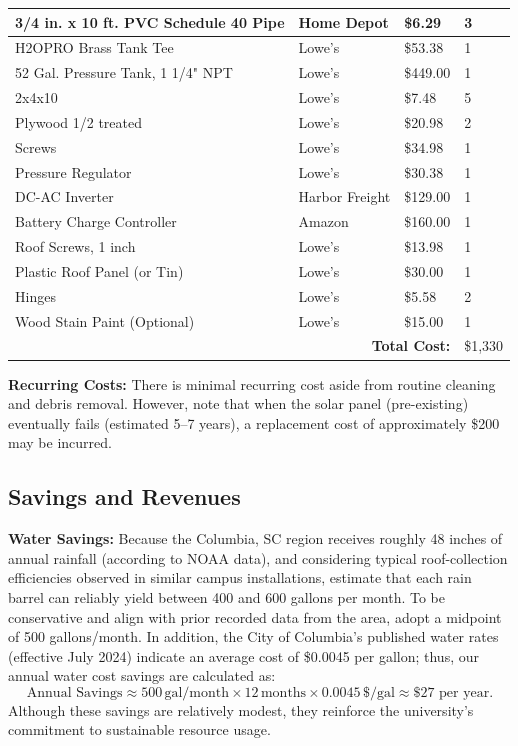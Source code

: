 \documentclass[12pt]{article}
\begin{document}
\begin{longtable}{|p{8cm}|p{2.5cm}|p{2cm}|p{1cm}|}
3/4 in. x 10 ft. PVC Schedule 40 Pipe & Home Depot & \$6.29 & 3 \\ \hline
H2OPRO Brass Tank Tee & Lowe's & \$53.38 & 1 \\ \hline
52 Gal. Pressure Tank, 1 1/4" NPT & Lowe's & \$449.00 & 1 \\ \hline
2x4x10 & Lowe's & \$7.48 & 5 \\ \hline
Plywood 1/2 treated & Lowe's & \$20.98 & 2 \\ \hline
Screws & Lowe's & \$34.98 & 1 \\ \hline
Pressure Regulator & Lowe's & \$30.38 & 1 \\ \hline
DC-AC Inverter & Harbor Freight & \$129.00 & 1 \\ \hline
Battery Charge Controller & Amazon & \$160.00 & 1 \\ \hline
Roof Screws, 1 inch & Lowe's & \$13.98 & 1 \\ \hline
Plastic Roof Panel (or Tin) & Lowe's & \$30.00 & 1 \\ \hline
Hinges & Lowe's & \$5.58 & 2 \\ \hline
Wood Stain Paint (Optional) & Lowe's & \$15.00 & 1 \\ \hline
\multicolumn{3}{|r|}{\textbf{Total Cost:}} & \$1,330 \\ \hline
\end{longtable}


\noindent\textbf{Recurring Costs:}  
There is minimal recurring cost aside from routine cleaning and debris removal. However, note that when the solar panel (pre-existing) eventually fails (estimated 5--7 years), a replacement cost of approximately \$200 may be incurred.

\subsection*{Savings and Revenues}

\textbf{Water Savings:}  
Because the Columbia, SC region receives roughly 48 inches of annual rainfall (according to NOAA data), and considering typical roof-collection efficiencies observed in similar campus installations, estimate that each rain barrel can reliably yield between 400 and 600 gallons per month. To be conservative and align with prior recorded data from the area, adopt a midpoint of 500 gallons/month. In addition, the City of Columbia’s published water rates (effective July 2024) indicate an average cost of \$0.0045 per gallon; thus, our annual water cost savings are calculated as:
\[
\text{Annual Savings} \approx 500\,\text{gal/month} 
\times 12\,\text{months} 
\times 0.0045\,\$/\text{gal} 
\approx \$27 \text{ per year.}
\]
Although these savings are relatively modest, they reinforce the university’s commitment to sustainable resource usage.
\end{document}
